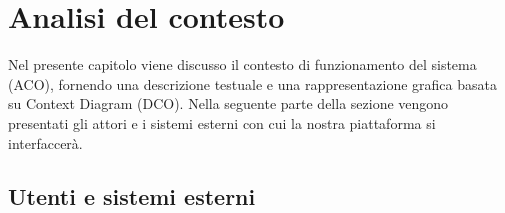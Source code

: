 \section{Analisi del contesto}
\label{secD2:AnalisiDelContesto}


Nel presente capitolo viene discusso il contesto di funzionamento del sistema (ACO), fornendo una descrizione testuale e una rappresentazione grafica basata su Context Diagram (DCO).
Nella seguente parte della sezione vengono presentati gli attori e i sistemi esterni con cui la nostra piattaforma si interfaccerà.

\subsection{Utenti e sistemi esterni}


